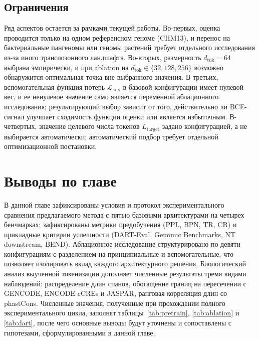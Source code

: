 \subsection{Ограничения}

Ряд аспектов остается за рамками текущей работы. Во-первых, оценка
проводится только на одном референсном геноме (CHM13), и перенос на
бактериальные пангеномы или геномы растений требует отдельного
исследования из-за иного транспозонного ландшафта. Во-вторых,
размерность $d_{\text{tok}} = 64$ выбрана эмпирически, и при ablation
на $d_{\text{tok}} \in \{32, 128, 256\}$ возможно обнаружится
оптимальная точка вне выбранного значения. В-третьих, вспомогательная
функция потерь $\mathcal L_{\text{aux}}$ в базовой конфигурации
имеет нулевой вес, и ее ненулевое значение само является переменной
аблационного исследования; результирующий выбор зависит от того,
действительно ли BCE-сигнал улучшает сходимость функции оценки или
является избыточным. В-четвертых, значение целевого числа токенов
$L_{\text{target}}$ задано конфигурацией, а не выбирается
автоматически; автоматический подбор требует отдельной оптимизационной
постановки.

\section{Выводы по главе}

В данной главе зафиксированы условия и протокол экспериментального
сравнения предлагаемого метода с пятью базовыми архитектурами на
четырех бенчмарках; зафиксированы метрики предобучения (PPL, BPN, TR,
CR) и прикладные критерии успешности (DART-Eval, Genomic Benchmarks,
NT downstream, BEND). Аблационное исследование структурировано по
девяти конфигурациям с разделением на принципиальные и
вспомогательные, что позволяет изолировать вклад каждого
архитектурного решения. Биологический анализ выученной токенизации
дополняет численные результаты тремя видами наблюдений: распределение
длин спанов, обогащение границ на пересечении с GENCODE, ENCODE
cCREs и JASPAR, ранговая корреляция длин со phastCons. Численные
значения, полученные при прохождении полного экспериментального
цикла, заполнят таблицы~\ref{tab:pretrain}, \ref{tab:ablation} и
\ref{tab:dart}, после чего основные выводы будут уточнены и
сопоставлены с гипотезами, сформулированными в данной главе.

